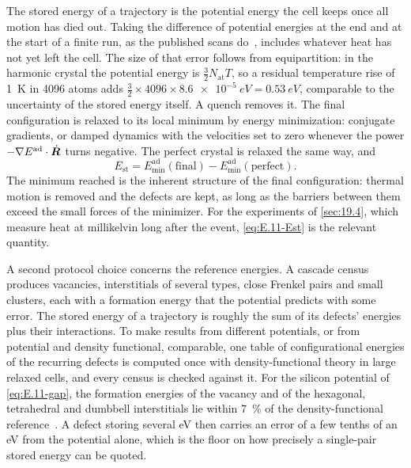 The stored energy of a trajectory is the potential energy the cell keeps once all motion has died out. Taking the difference of potential energies at the end and at the start of a finite run, as the published scans do~\cite[Sect.~II\,A]{sassi2022energy}, includes whatever heat has not yet left the cell. The size of that error follows from equipartition: in the harmonic crystal the potential energy is $\tfrac32N_{\mathrm{at}}T$, so a residual temperature rise of \SI{1}{K} in 4096 atoms adds $\tfrac32\times4096\times\SI{8.6e-5}{eV} = \SI{0.53}{eV}$, comparable to the uncertainty of the stored energy itself. A quench removes it. The final configuration is relaxed to its local minimum by energy minimization: conjugate gradients, or damped dynamics with the velocities set to zero whenever the power $-\nabla E^{\mathrm{ad}}\cdot\dot{\bm{R}}$ turns negative. The perfect crystal is relaxed the same way, and
\begin{equation}
  E_{\mathrm{st}} = E^{\mathrm{ad}}_{\mathrm{min}}(\text{final}) - E^{\mathrm{ad}}_{\mathrm{min}}(\text{perfect}) .
  \label{eq:E.11-Est}
\end{equation}
The minimum reached is the inherent structure of the final configuration: thermal motion is removed and the defects are kept, as long as the barriers between them exceed the small forces of the minimizer. For the experiments of \cref{sec:19.4}, which measure heat at millikelvin long after the event, \cref{eq:E.11-Est} is the relevant quantity.

A second protocol choice concerns the reference energies. A cascade census produces vacancies, interstitials of several types, close Frenkel pairs and small clusters, each with a formation energy that the potential predicts with some error. The stored energy of a trajectory is roughly the sum of its defects' energies plus their interactions. To make results from different potentials, or from potential and density functional, comparable, one table of configurational energies of the recurring defects is computed once with density-functional theory in large relaxed cells, and every census is checked against it. For the silicon potential of \cref{eq:E.11-gap}, the formation energies of the vacancy and of the hexagonal, tetrahedral and dumbbell interstitials lie within \SI{7}{\percent} of the density-functional reference~\cite[Sect.~III\,E]{bartok2018machine}. A defect storing several eV then carries an error of a few tenths of an eV from the potential alone, which is the floor on how precisely a single-pair stored energy can be quoted.

